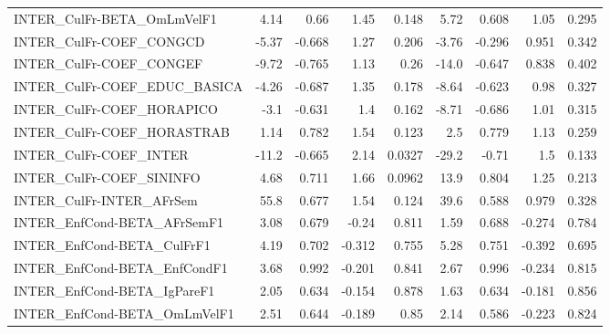 \begin{tabular}{lrrrrrrrr}
INTER\_CulFr-BETA\_OmLmVelF1            &        4.14 &         0.66 &    1.45 &    0.148 &       5.72 &       0.608 &         1.05 &         0.295 \\
INTER\_CulFr-COEF\_CONGCD               &       -5.37 &       -0.668 &    1.27 &    0.206 &      -3.76 &      -0.296 &        0.951 &         0.342 \\
INTER\_CulFr-COEF\_CONGEF               &       -9.72 &       -0.765 &    1.13 &     0.26 &      -14.0 &      -0.647 &        0.838 &         0.402 \\
INTER\_CulFr-COEF\_EDUC\_BASICA          &       -4.26 &       -0.687 &    1.35 &    0.178 &      -8.64 &      -0.623 &         0.98 &         0.327 \\
INTER\_CulFr-COEF\_HORAPICO             &        -3.1 &       -0.631 &     1.4 &    0.162 &      -8.71 &      -0.686 &         1.01 &         0.315 \\
INTER\_CulFr-COEF\_HORASTRAB            &        1.14 &        0.782 &    1.54 &    0.123 &        2.5 &       0.779 &         1.13 &         0.259 \\
INTER\_CulFr-COEF\_INTER                &       -11.2 &       -0.665 &    2.14 &   0.0327 &      -29.2 &       -0.71 &          1.5 &         0.133 \\
INTER\_CulFr-COEF\_SININFO              &        4.68 &        0.711 &    1.66 &   0.0962 &       13.9 &       0.804 &         1.25 &         0.213 \\
INTER\_CulFr-INTER\_AFrSem              &        55.8 &        0.677 &    1.54 &    0.124 &       39.6 &       0.588 &        0.979 &         0.328 \\
INTER\_EnfCond-BETA\_AFrSemF1           &        3.08 &        0.679 &   -0.24 &    0.811 &       1.59 &       0.688 &       -0.274 &         0.784 \\
INTER\_EnfCond-BETA\_CulFrF1            &        4.19 &        0.702 &  -0.312 &    0.755 &       5.28 &       0.751 &       -0.392 &         0.695 \\
INTER\_EnfCond-BETA\_EnfCondF1          &        3.68 &        0.992 &  -0.201 &    0.841 &       2.67 &       0.996 &       -0.234 &         0.815 \\
INTER\_EnfCond-BETA\_IgPareF1           &        2.05 &        0.634 &  -0.154 &    0.878 &       1.63 &       0.634 &       -0.181 &         0.856 \\
INTER\_EnfCond-BETA\_OmLmVelF1          &        2.51 &        0.644 &  -0.189 &     0.85 &       2.14 &       0.586 &       -0.223 &         0.824 \\

\end{tabular}
